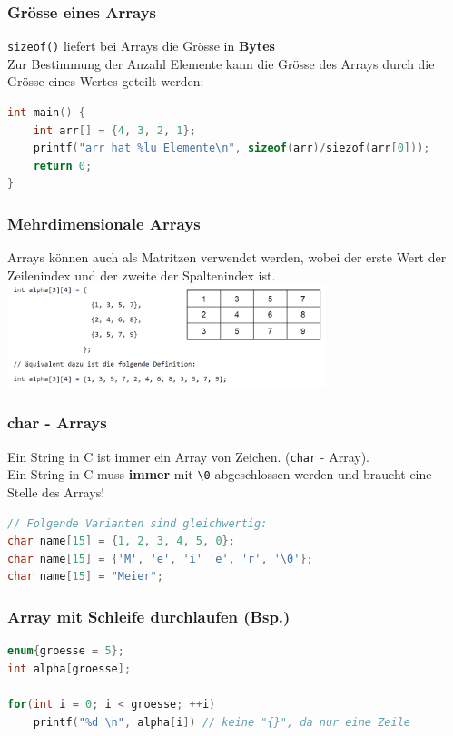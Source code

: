 		\subsubsection{Grösse eines Arrays}
			\verb|sizeof()| liefert bei Arrays die Grösse in \textbf{Bytes}\\
			Zur Bestimmung der Anzahl Elemente kann die Grösse des Arrays durch die Grösse eines Wertes geteilt werden:
			\begin{lstlisting}[language=C]
int main() {
	int arr[] = {4, 3, 2, 1};
	printf("arr hat %lu Elemente\n", sizeof(arr)/siezof(arr[0]));
	return 0;
}
			\end{lstlisting}

		\subsubsection{Mehrdimensionale Arrays}
			Arrays können auch als Matritzen verwendet werden, wobei der erste Wert der Zeilenindex und der zweite der Spaltenindex ist.\\
			\includegraphics[height=3cm]{Bilder/arr_mehrdimensional.png}

		\subsubsection{char - Arrays}
			Ein String in C ist immer ein Array von Zeichen. (\verb|char| - Array).\\
			Ein String in C muss \textbf{immer} mit \verb|\0| abgeschlossen werden und braucht eine Stelle des Arrays!
			\begin{lstlisting}[language=C]
// Folgende Varianten sind gleichwertig:
char name[15] = {1, 2, 3, 4, 5, 0};
char name[15] = {'M', 'e', 'i' 'e', 'r', '\0'};
char name[15] = "Meier";
			\end{lstlisting}

		\subsubsection{Array mit Schleife durchlaufen (Bsp.)}
			\begin{lstlisting}[language=C]
enum{groesse = 5};
int alpha[groesse];

for(int i = 0; i < groesse; ++i)
	printf("%d \n", alpha[i]) // keine "{}", da nur eine Zeile
			\end{lstlisting}

